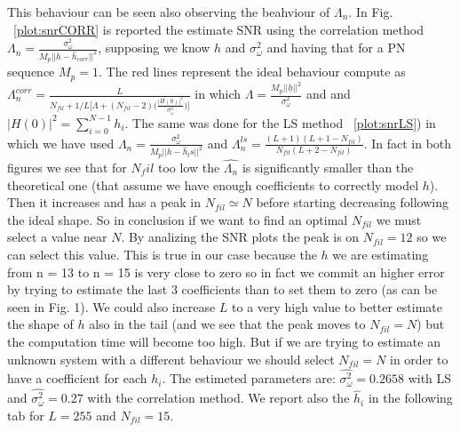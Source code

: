 \documentclass{article}
\renewcommand{\vec}[1]{\underline{#1}}
\begin{document}
\newline This behaviour can be seen also observing the beahviour of $\Lambda_n$. In Fig. ~\ref{plot:snrCORR} is reported the estimate SNR using the correlation method $\Lambda_n = \frac{\sigma_\omega^2}{M_p || h-\hat{h}_{corr} ||^2}$, supposing we know $h$ and $\sigma_\omega^2$ and having that for a PN sequence $M_p = 1$. The red lines represent the ideal behaviour compute as $\Lambda_n^{corr} = \frac{L}{N_{fil} + 1/L \bigl[ \Lambda + (N_{fil}-2)\bigl(\frac{|H(0)|^2}{\sigma_\omega^2} \bigr)\bigr]}$ in which $\Lambda = \frac{M_p||\vec{h}||^2}{\sigma_\omega^2}$  and and $|H(0)|^2 = \sum_{i=0}^{N-1} h_i$. 
  The same was done for the LS method ~\ref{plot:snrLS}) in which we have used $\Lambda_n = \frac{\sigma_\omega^2}{M_p || h-\hat{h}_ls ||^2}$ and $\Lambda_n^{ls} = \frac{(L+1)(L+1-N_{fil})}{N_{fil}(L+2-N_{fil})}$.
  In fact in both figures we see that for $N_fil$ too low the $\hat{\Lambda_n}$ is significantly smaller than the theoretical one (that assume we have enough coefficients to correctly model $h$). Then it increases and has a peak in $N_{fil} \simeq N$ before starting decreasing following the ideal shape.  So in conclusion if we want to find an optimal $N_{fil}$ we must select a value near $N$. By analizing the SNR plots the peak is on $N_{fil} = 12$ so we can select this value. This is true in our case because the $h$ we are estimating from n = 13 to n = 15 is very close to zero so in fact we commit an higher error by trying to estimate the last 3 coefficients than to set them to zero (as can be seen in Fig. 1). We could also increase $L$ to a very high value to better estimate the shape of $h$ also in the tail (and we see that the peak moves to $N_{fil} = N$) but the computation time will become too high. But if we are trying to estimate an unknown system with a different behaviour we should select $N_{fil} = N$ in order to have a coefficient for each $h_i$. 
  The estimeted parameters are: $\hat{\sigma_\omega^2} = 0.2658$ with LS and $\hat{\sigma_\omega^2} = 0.27$ with the correlation method. We report also the $\hat{h}_i$ in the following tab for $L = 255$ and $N_{fil} = 15$.
  
\end{document}
